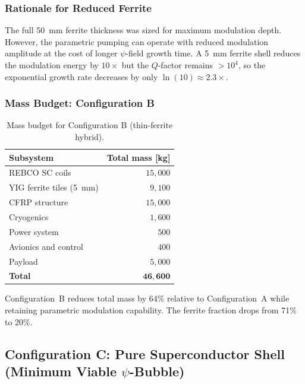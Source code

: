 \documentclass[11pt,a4paper]{article}
\begin{document}
\subsubsection{Rationale for Reduced Ferrite}

The full \SI{50}{mm} ferrite thickness was sized for maximum modulation
depth. However, the parametric pumping can operate with reduced modulation
amplitude at the cost of longer $\psi$-field growth time. A \SI{5}{mm}
ferrite shell reduces the modulation energy by $10\times$ but the $Q$-factor
remains $>10^4$, so the exponential growth rate decreases by only $\ln(10)
\approx 2.3\times$.

\subsubsection{Mass Budget: Configuration B}

\begin{table}[h]
\centering
\caption{Mass budget for Configuration B (thin-ferrite hybrid).}
\label{tab:mass_B}
\begin{tabular}{@{}lr@{}}
\toprule
Subsystem & Total mass [\si{kg}] \\
\midrule
REBCO SC coils & $15{,}000$ \\
YIG ferrite tiles (\SI{5}{mm}) & $9{,}100$ \\
CFRP structure & $15{,}000$ \\
Cryogenics & $1{,}600$ \\
Power system & $500$ \\
Avionics and control & $400$ \\
Payload & $5{,}000$ \\
\midrule
\textbf{Total} & $\mathbf{46{,}600}$ \\
\bottomrule
\end{tabular}
\end{table}

Configuration~B reduces total mass by 64\% relative to Configuration~A while
retaining parametric modulation capability. The ferrite fraction drops from
71\% to 20\%.

\subsection{Configuration C: Pure Superconductor Shell (Minimum Viable $\psi$-Bubble)}
\end{document}
